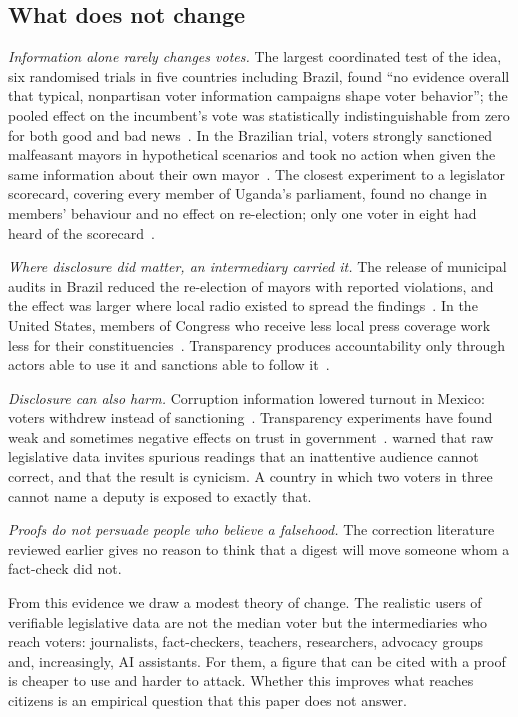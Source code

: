 \subsection{What does not change}

\emph{Information alone rarely changes votes.} The largest coordinated test of the idea, six randomised trials in five countries including Brazil, found ``no evidence overall that typical, nonpartisan voter information campaigns shape voter behavior''; the pooled effect on the incumbent's vote was statistically indistinguishable from zero for both good and bad news~\citep{dunning2019metaketa}. In the Brazilian trial, voters strongly sanctioned malfeasant mayors in hypothetical scenarios and took no action when given the same information about their own mayor~\citep{boas2019norms}. The closest experiment to a legislator scorecard, covering every member of Uganda's parliament, found no change in members' behaviour and no effect on re-election; only one voter in eight had heard of the scorecard~\citep{humphreys2012policing}.

\emph{Where disclosure did matter, an intermediary carried it.} The release of municipal audits in Brazil reduced the re-election of mayors with reported violations, and the effect was larger where local radio existed to spread the findings~\citep{ferraz2008exposing}. In the United States, members of Congress who receive less local press coverage work less for their constituencies~\citep{snyder2010press}. Transparency produces accountability only through actors able to use it and sanctions able to follow it~\citep{fox2007uncertain,fung2007full,peixoto2016when}.

\emph{Disclosure can also harm.} Corruption information lowered turnout in Mexico: voters withdrew instead of sanctioning~\citep{chong2015corruption}. Transparency experiments have found weak and sometimes negative effects on trust in government~\citep{grimmelikhuijsen2013effect}. \citet{lessig2009against} warned that raw legislative data invites spurious readings that an inattentive audience cannot correct, and that the result is cynicism. A country in which two voters in three cannot name a deputy is exposed to exactly that.

\emph{Proofs do not persuade people who believe a falsehood.} The correction literature reviewed earlier gives no reason to think that a digest will move someone whom a fact-check did not.

From this evidence we draw a modest theory of change. The realistic users of verifiable legislative data are not the median voter but the intermediaries who reach voters: journalists, fact-checkers, teachers, researchers, advocacy groups and, increasingly, AI assistants. For them, a figure that can be cited with a proof is cheaper to use and harder to attack. Whether this improves what reaches citizens is an empirical question that this paper does not answer.

